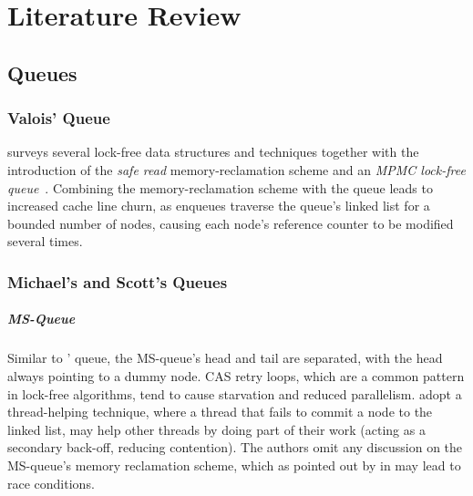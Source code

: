 \chapter{Literature Review\label{chap:lit_review}}

\section{Queues}
\subsection{Valois' Queue}

\citeauthor{valois1994queues} surveys several lock-free data structures and
techniques together with the introduction of the \emph{safe read}
memory-reclamation scheme and an \emph{MPMC lock-free
queue}~\citep{valois1994queues,valois1995datastructures}.
Combining the memory-reclamation scheme with the queue leads to increased cache line
churn, as enqueues traverse the queue's linked list for a bounded number of
nodes, causing each node's reference counter to be modified several times. 


\subsection{Michael's and Scott's Queues}

\paragraph{MS-Queue}
Similar to \citeauthor{valois1994queues}' queue, the MS-queue's head and tail
are separated, with the head always pointing to a dummy node. CAS
retry loops, which are a common pattern in lock-free algorithms, tend to
cause starvation and reduced parallelism.
\citeauthor{michael1996simple} adopt a thread-helping technique, where a thread
that fails to commit a node to the linked list, may help other threads by doing
part of their work (acting as a secondary back-off, reducing contention). 
The authors omit any discussion on the MS-queue's memory reclamation scheme,
which as pointed out by \citeauthor{michael2004hazard}
in \citep{michael2004hazard} may lead to race conditions. 

